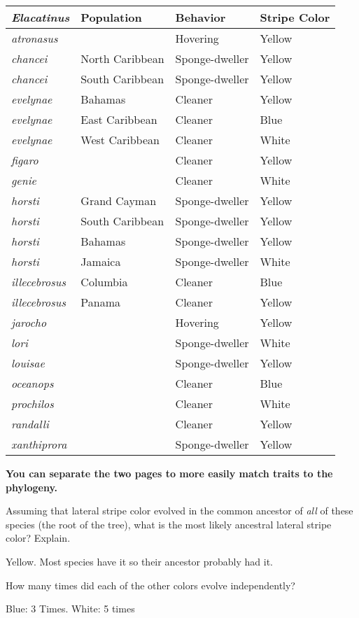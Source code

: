 \documentclass[12pt, hidelinks]{exam}
\newcommand*\AnswerBox[2]{%
    \parbox[t][#1]{0.92\textwidth}{%
    \begin{solution}#2\end{solution}}
    \vspace{\stretch{1}}
}
\begin{document}
\begin{questions}
\label{color_behavior}
\begin{tabular}[c]{@{}llll@{}}
	\toprule
	\textit{Elacatinus}		&	Population		&	Behavior		&	Stripe Color \tabularnewline
	\midrule
	\textit{atronasus}		&					&	Hovering		&	Yellow	\tabularnewline
	\textit{chancei} 		&	North Caribbean	&	Sponge-dweller	&	Yellow	\tabularnewline
	\textit{chancei} 		&	South Caribbean	&	Sponge-dweller	&	Yellow	\tabularnewline
	\textit{evelynae} 		&	Bahamas			&	Cleaner			&	Yellow	\tabularnewline
	\textit{evelynae} 		&	East Caribbean	&	Cleaner			&	Blue 	\tabularnewline
	\textit{evelynae} 		&	West Caribbean	&	Cleaner			&	White	\tabularnewline
	\textit{figaro}			&					&	Cleaner			&	Yellow	\tabularnewline
	\textit{genie}			&					&	Cleaner			&	White	\tabularnewline
	\textit{horsti} 		&	Grand Cayman	&	Sponge-dweller	&	Yellow	\tabularnewline
	\textit{horsti} 		&	South Caribbean	&	Sponge-dweller	&	Yellow	\tabularnewline
	\textit{horsti} 		&	Bahamas			&	Sponge-dweller	&	Yellow	\tabularnewline
	\textit{horsti} 		&	Jamaica			&	Sponge-dweller	&	White	\tabularnewline
	\textit{illecebrosus}	&	Columbia		&	Cleaner			&	Blue	\tabularnewline
	\textit{illecebrosus} 	&	Panama			&	Cleaner			&	Yellow	\tabularnewline
	\textit{jarocho}		&					&	Hovering		&	Yellow	\tabularnewline
	\textit{lori}			&					&	Sponge-dweller	&	White	\tabularnewline
	\textit{louisae}		&					&	Sponge-dweller	&	Yellow	\tabularnewline
	\textit{oceanops}		&					&	Cleaner			&	Blue	\tabularnewline
	\textit{prochilos}		&					&	Cleaner			&	White	\tabularnewline
	\textit{randalli}		&					&	Cleaner			&	Yellow	\tabularnewline
	\textit{xanthiprora}	&					&	Sponge-dweller	&	Yellow	\tabularnewline
	\bottomrule
\end{tabular}

\textbf{You can separate the two pages to more easily match traits to the phylogeny.}

\newpage

\question \label{questions_continued}
Assuming that lateral stripe color evolved in the common ancestor
of \emph{all} of these species (the root of the tree), what is the most likely ancestral lateral
stripe color? Explain. %

\AnswerBox{3\baselineskip}{Yellow. Most species have it so their ancestor probably had it.}

\question
How many times did each of the other colors evolve independently?

\AnswerBox{2\baselineskip}{Blue: 3 Times. \quad White: 5 times}



\end{questions}
\end{document}
